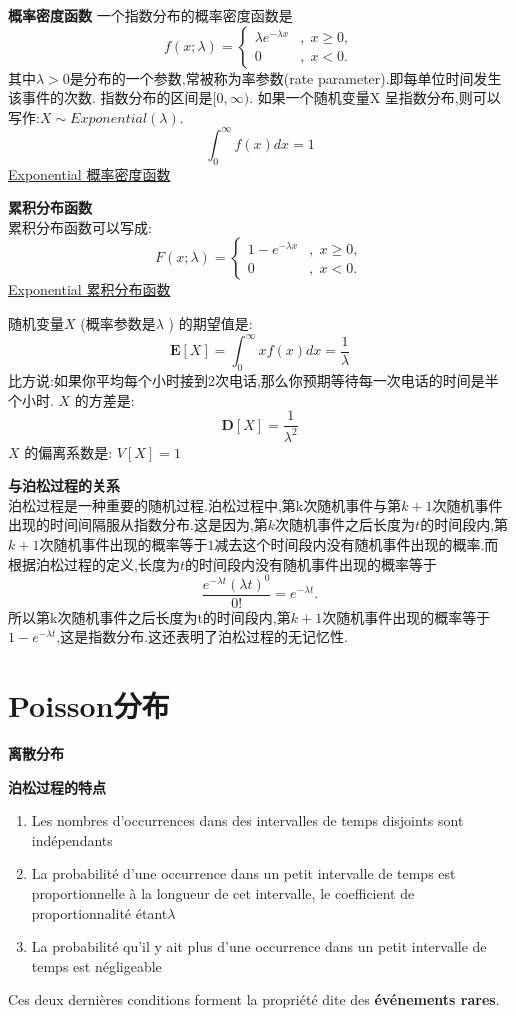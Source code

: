 \documentclass{article}
\begin{document}
\textbf{概率密度函数}
一个指数分布的概率密度函数是
$$f(x;\lambda )=\left\{{\begin{matrix}\lambda e^{{-\lambda x}}&,\;x\geq 0,\\0&,\;x<0.\end{matrix}}\right.$$
其中$\lambda  > 0$是分布的一个参数,常被称为率参数(rate parameter).即每单位时间发生该事件的次数.
指数分布的区间是$[0,\infty)$. 如果一个随机变量X 呈指数分布,则可以写作:$X \sim Exponential(\lambda )$.
$$
\int_0^{\infty} f(x)dx = 1
$$
\href{http://upload.wikimedia.org/wikipedia/commons/thumb/b/b1/Exponential\_distribution\_pdf.png/800px-Exponential\_distribution\_pdf.png}{Exponential 概率密度函数}
	
\textbf{累积分布函数}\\
累积分布函数可以写成:
$$F(x;\lambda )=\left\{{\begin{matrix}1-e^{{-\lambda x}}&,\;x\geq 0,\\0&,\;x<0.\end{matrix}}\right.$$
\href{http://upload.wikimedia.org/wikipedia/commons/thumb/b/b1/Exponential\_distribution\_pdf.png/800px-Exponential\_distribution\_pdf.png}{Exponential 累积分布函数}
	
随机变量$X$ (概率参数是$\lambda$ ) 的期望值是:
$$
{\mathbf  {E}}[X]=\int_0^{\infty} xf(x)dx = {\frac  {1}{\lambda }}
$$
比方说:如果你平均每个小时接到2次电话,那么你预期等待每一次电话的时间是半个小时.
$X$ 的方差是:
$${\mathbf  {D}}[X]={\frac{1}{\lambda ^{2}}}
$$
$X$ 的偏离系数是: $V[X] = 1$

\textbf{与泊松过程的关系}\\
泊松过程是一种重要的随机过程.泊松过程中,第k次随机事件与第$k+1$次随机事件出现的时间间隔服从指数分布.这是因为,第$k$次随机事件之后长度为$t$的时间段内,第$k+1$次随机事件出现的概率等于$1$减去这个时间段内没有随机事件出现的概率.而根据泊松过程的定义,长度为$t$的时间段内没有随机事件出现的概率等于
$$
{\frac  {e^{{-\lambda t}}(\lambda t)^{0}}{0!}}=e^{{-\lambda t}}.
$$
所以第k次随机事件之后长度为t的时间段内,第$k+1$次随机事件出现的概率等于$1-e^{{-\lambda t}}$,这是指数分布.这还表明了泊松过程的无记忆性.

\section{Poisson分布}
\label{sec.distribution.poisson}
\textbf{离散分布}

\textbf{泊松过程的特点}
\begin{enumerate}
\item Les nombres d'occurrences dans des intervalles de temps disjoints sont ind\'ependants
\item La probabilit\'e d'une occurrence dans un petit intervalle de temps est proportionnelle \`a la longueur de cet intervalle, le coefficient de proportionnalit\'e \'etant$ \lambda$
\item La probabilit\'e qu'il y ait plus d'une occurrence dans un petit intervalle de temps est n\'egligeable
\end{enumerate}
Ces deux derni\`eres conditions forment la propri\'et\'e dite des \textbf{\'ev\'enements rares}.
\end{document}
